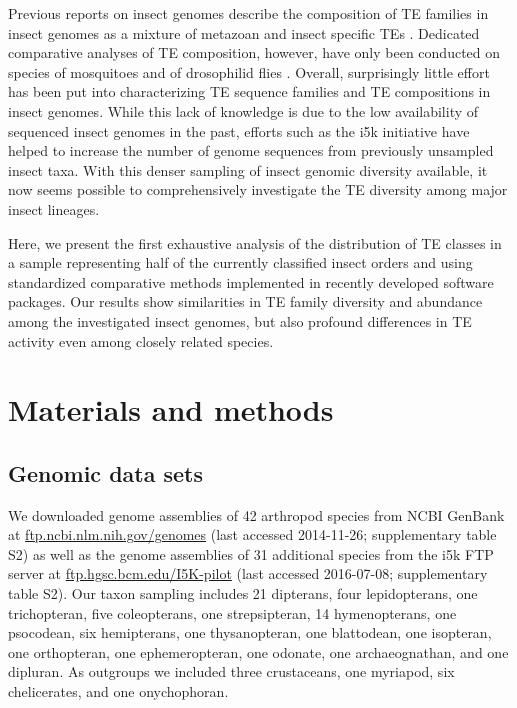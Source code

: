 Previous reports on insect genomes describe the composition of TE
families in insect genomes as a mixture of metazoan and insect specific
TEs \citep{Feschotte2007}. Dedicated comparative analyses of TE
composition, however, have only been conducted on species of mosquitoes
\citep{Neafsey2014} and of drosophilid flies \citep{Sessegolo2016}.
Overall, surprisingly little effort has been put into characterizing TE
sequence families and TE compositions in insect genomes. While this lack
of knowledge is due to the low availability of sequenced insect genomes
in the past, efforts such as the i5k initiative \citep{Robinson2011}
have helped to increase the number of genome sequences from previously
unsampled insect taxa. With this denser sampling of insect genomic
diversity available, it now seems possible to comprehensively
investigate the TE diversity among major insect lineages.

Here, we present the first exhaustive analysis of the distribution of TE
classes in a sample representing half of the currently classified insect
orders and using standardized comparative methods implemented in
recently developed software packages.  Our results show similarities in
TE family diversity and abundance among the investigated insect genomes,
but also profound differences in TE activity even among closely related
species.

\section{Materials and methods}\label{materials-and-methods}

\subsection{Genomic data sets}\label{genomic-data-sets}

We downloaded genome assemblies of 42 arthropod species from NCBI
GenBank at \url{ftp.ncbi.nlm.nih.gov/genomes} (last accessed 2014-11-26;
supplementary table S2) as well as the genome assemblies of 31
additional species from the i5k FTP server at
\href{ftp://ftp.hgsc.bcm.edu:/I5K-pilot/}{ftp.hgsc.bcm.edu/I5K-pilot}
(last accessed 2016-07-08; supplementary table S2). Our taxon sampling
includes 21 dipterans, four lepidopterans, one trichopteran, five
coleopterans, one strepsipteran, 14 hymenopterans, one psocodean, six
hemipterans, one thysanopteran, one blattodean, one isopteran, one
orthopteran, one ephemeropteran, one odonate, one archaeognathan, and
one dipluran. As outgroups we included three crustaceans, one myriapod,
six chelicerates, and one onychophoran.

